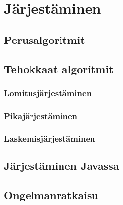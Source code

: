 \chapter{Järjestäminen}

\section{Perusalgoritmit}

\section{Tehokkaat algoritmit}

\subsection{Lomitusjärjestäminen}

\subsection{Pikajärjestäminen}

\subsection{Laskemisjärjestäminen}

\section{Järjestäminen Javassa}

\section{Ongelmanratkaisu}
